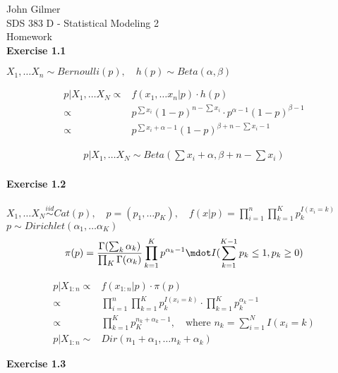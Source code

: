\documentclass[12pt]{article}
\begin{document}
    \noindent John Gilmer \\
    \noindent SDS 383 D - Statistical Modeling 2 \\
    \noindent Homework \\

    \noindent\textbf{Exercise 1.1}

    \(X_1, \dots X_n \sim Bernoulli(p), \quad h(p) \sim Beta(\alpha, \beta)\)

    \begin{align*}
        p | X_1, \dots X_N \propto& f(x_1, \dots x_n |p) \cdot h(p) \\
        \propto&  p^{\sum x_i} (1 - p)^{n- \sum x_i} \cdot p^{\alpha - 1} (1 - p) ^{\beta - 1} \\
        \propto&  p^{\sum x_i + \alpha - 1} (1 - p)^{\beta + n - \sum x_i - 1}
    \end{align*}

    \begin{align*}
      p | X_1, \dots X_N \sim Beta(\sum x_i + \alpha, \beta + n - \sum x_i)
    \end{align*}
    \\

    \noindent\textbf{Exercise 1.2} \\ \\
    \(X_1, \dots X_N \stackrel{iid}{\sim} Cat(p), \quad p = (p_1, \dots p_K), \quad
       f(x | p) = \prod_{i=1}^{n} \prod_{k=1}^{K} p_k ^{I(x_i = k)}\) \\
    \( p \sim Dirichlet(\alpha_1, \dots \alpha_K)\) \\
    \begin{equation*}
    \pi(p) = \frac{\Gamma (\sum_k \alpha_k)}{\prod_K \Gamma(\alpha_k)} \prod_{k=1}^{K}
        p^{\alpha_k - 1} \mdot I(\sum_{k=1}^{K-1} p_k \leq 1, p_k \geq 0)
    \end{equation*}

    \begin{align*}
        p | X_{1:n} \propto& f(x_{1:n} | p) \cdot \pi(p) \\
        \propto& \prod_{i=1} ^{n} \prod_{k=1}^K p_k ^{I(x_i = k)} \cdot \prod_{k=1}^{K} p_k^{\alpha_k -1} \\
        \propto & \prod_{k=1}^K p_K ^{n_k + \alpha_k -1}, \quad \text{where }n_k = \sum_{i=1}^{N} I(x_i = k) \\
        p | X_{1:n} \sim& Dir(n_1 + \alpha_1, \dots n_k + \alpha_k)
    \end{align*}

    \noindent \textbf{Exercise 1.3} \\ \\
\end{document}

